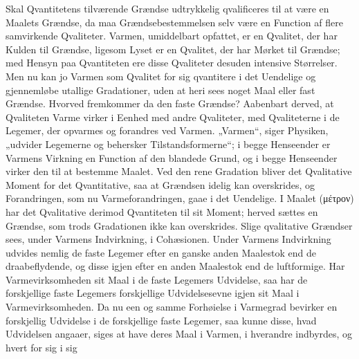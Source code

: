 \documentclass[12pt]{book}
\newcommand{\opage}[1]{\marginnote{\footnotesize\textit{[#1]}}}
\begin{document}
Skal Qvantitetens tilværende Grændse udtrykkelig qvalificeres til at være en Maalets Grændse, da maa
Grændsebestemmelsen selv være en Function af flere samvirkende Qvaliteter. Varmen, umiddelbart opfattet,
er en Qvalitet, der har Kulden til Grændse, ligesom Lyset er en Qvalitet, der har Mørket til Grændse;
med Hensyn paa Qvantiteten ere disse Qvaliteter desuden intensive Størrelser. Men nu kan jo Varmen som
Qvalitet for sig qvantitere i det Uendelige og gjennemløbe utallige Gradationer, uden at heri sees noget
Maal eller fast Grændse. Hvorved fremkommer da den faste Grændse? Aabenbart derved, at Qvaliteten Varme
virker i Eenhed med andre Qvaliteter, med Qvaliteterne i de Legemer, der opvarmes og forandres ved
Varmen. „Varmen“, siger Physiken, „udvider Legemerne og behersker Tilstandsformerne“; i begge Henseender
er Varmens Virkning en Function af den blandede Grund, og i begge Henseender virker den til at bestemme
Maalet. Ved den rene Gradation bliver det Qvalitative Moment for det Qvantitative, saa at Grændsen idelig
kan overskrides, og Forandringen, som nu Varmeforandringen, gaae i det Uendelige. I Maalet (μέτρον) har
det Qvalitative derimod Qvantiteten til sit Moment; herved sættes en Grændse, som trods Gradationen ikke
kan overskrides. Slige qvalitative Grændser sees, under Varmens Indvirkning, i Cohæsionen. Under Varmens
Indvirkning udvides nemlig de faste Legemer efter en ganske anden Maalestok end de draabeflydende, og
disse igjen efter en anden Maalestok end de luftformige. Har Varmevirksomheden sit Maal i de faste
Legemers Udvidelse, saa har de forskjellige faste Legemers forskjellige Udvidelsesevne igjen sit Maal i
Varmevirksomheden. Da nu een og samme Forhøielse i
\opage{320} Varmegrad bevirker en forskjellig Udvidelse i de forskjellige faste Legemer, saa kunne disse, hvad
Udvidelsen angaaer, siges at have deres Maal i Varmen, i hverandre indbyrdes, og hvert for sig i sig
\end{document}
